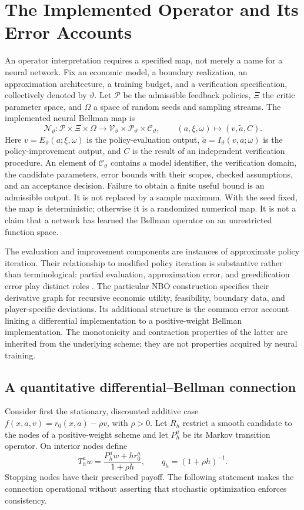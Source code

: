 \section{The Implemented Operator and Its Error Accounts}\label{sec:implemented}
An operator interpretation requires a specified map, not merely a name for a neural network. Fix an economic model, a boundary realization, an approximation architecture, a training budget, and a verification specification, collectively denoted by $\vartheta$. Let $\mathcal P$ be the admissible feedback policies, $\Xi$ the critic parameter space, and $\Omega$ a space of random seeds and sampling streams. The implemented neural Bellman map is
\begin{equation}\label{eq:implementedmap}
 \mathcal N_\vartheta:\mathcal P\times\Xi\times\Omega
 \longrightarrow\mathcal V_\vartheta\times\mathcal P_\vartheta\times\mathcal C_\vartheta,
 \qquad (a,\xi,\omega)\longmapsto(v,\widetilde a,C).
\end{equation}
Here $v=E_\vartheta(a;\xi,\omega)$ is the policy-evaluation output, $\widetilde a=I_\vartheta(v,a;\omega)$ is the policy-improvement output, and $C$ is the result of an independent verification procedure. An element of $\mathcal C_\vartheta$ contains a model identifier, the verification domain, the candidate parameters, error bounds with their scopes, checked assumptions, and an acceptance decision. Failure to obtain a finite useful bound is an admissible output. It is not replaced by a sample maximum. With the seed fixed, the map is deterministic; otherwise it is a randomized numerical map. It is not a claim that a network has learned the Bellman operator on an unrestricted function space.

The evaluation and improvement components are instances of approximate policy iteration. Their relationship to modified policy iteration is substantive rather than terminological: partial evaluation, approximation error, and greedification error play distinct roles \citep{scherrer2015}. The particular NBO construction specifies their derivative graph for recursive economic utility, feasibility, boundary data, and player-specific deviations. Its additional structure is the common error account linking a differential implementation to a positive-weight Bellman implementation. The monotonicity and contraction properties of the latter are inherited from the underlying scheme; they are not properties acquired by neural training.

\subsection{A quantitative differential--Bellman connection}
Consider first the stationary, discounted additive case $f(x,a,v)=r_0(x,a)-\rho v$, with $\rho>0$. Let $R_h$ restrict a smooth candidate to the nodes of a positive-weight scheme and let $P_h^a$ be its Markov transition operator. On interior nodes define
\[
 T_h^a w=\frac{P_h^aw+h r_0^a}{1+\rho h},\qquad q_h=(1+\rho h)^{-1}.
\]
Stopping nodes have their prescribed payoff. The following statement makes the connection operational without asserting that stochastic optimization enforces consistency.

